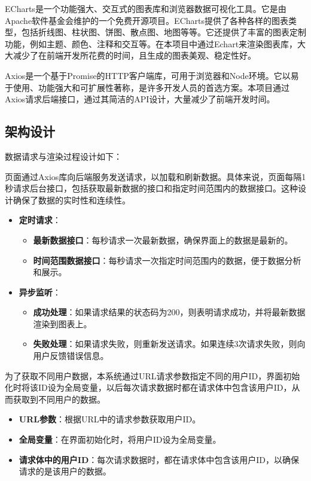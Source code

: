 \documentclass[oneside]{xduugthesis}
\begin{document}
ECharts是一个功能强大、交互式的图表库和浏览器数据可视化工具。它是由Apache软件基金会维护的一个免费开源项目。ECharts提供了各种各样的图表类型，包括折线图、柱状图、饼图、散点图、地图等等。它还提供了丰富的图表定制功能，例如主题、颜色、注释和交互等。在本项目中通过Echart来渲染图表库，大大减少了在前端开发所花费的时间，且生成的图表美观、稳定性好。

Axios是一个基于Promise的HTTP客户端库，可用于浏览器和Node环境。它以易于使用、功能强大和可扩展性著称，是许多开发人员的首选方案。本项目通过Axios请求后端接口，通过其简洁的API设计，大量减少了前端开发时间。

\subsection{架构设计}

数据请求与渲染过程设计如下：

页面通过Axios库向后端服务发送请求，以加载和刷新数据。具体来说，页面每隔1秒请求后台接口，包括获取最新数据的接口和指定时间范围内的数据接口。这种设计确保了数据的实时性和连续性。

\begin{itemize}[nosep]
    \item \textbf{定时请求}：
    \begin{itemize}[nosep]
        \item \textbf{最新数据接口}：每秒请求一次最新数据，确保界面上的数据是最新的。
        \item \textbf{时间范围数据接口}：每秒请求一次指定时间范围内的数据，便于数据分析和展示。
    \end{itemize}
    \item \textbf{异步监听}：
    \begin{itemize}[nosep]
        \item \textbf{成功处理}：如果请求结果的状态码为200，则表明请求成功，并将最新数据渲染到图表上。
        \item \textbf{失败处理}：如果请求失败，则重新发送请求。如果连续3次请求失败，则向用户反馈错误信息。
    \end{itemize}
\end{itemize}

为了获取不同用户数据，本系统通过URL请求参数指定不同的用户ID，界面初始化时将该ID设为全局变量，以后每次请求数据时都在请求体中包含该用户ID，从而获取到不同用户的数据。

\begin{itemize}[nosep]
    \item \textbf{URL参数}：根据URL中的请求参数获取用户ID。
    \item \textbf{全局变量}：在界面初始化时，将用户ID设为全局变量。
    \item \textbf{请求体中的用户ID}：每次请求数据时，都在请求体中包含该用户ID，以确保请求的是该用户的数据。
\end{itemize}
\end{document}
